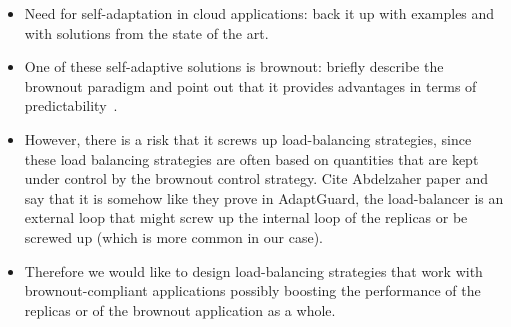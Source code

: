 
\begin{itemize}
\item Need for self-adaptation in cloud applications: back it up with
  examples and with solutions from the state of the art.
\item One of these self-adaptive solutions is brownout: briefly
  describe the brownout paradigm and point out that it provides
  advantages in terms of predictability~\cite{icse}.
\item However, there is a risk that it screws up load-balancing
  strategies, since these load balancing strategies are often based on
  quantities that are kept under control by the brownout control
  strategy. Cite Abdelzaher paper and say that it is somehow like they
  prove in AdaptGuard, the load-balancer is an external loop that
  might screw up the internal loop of the replicas or be screwed up
  (which is more common in our case).
\item Therefore we would like to design load-balancing strategies that
  work with brownout-compliant applications possibly boosting the
  performance of the replicas or of the brownout application as a
  whole.
\end{itemize}
